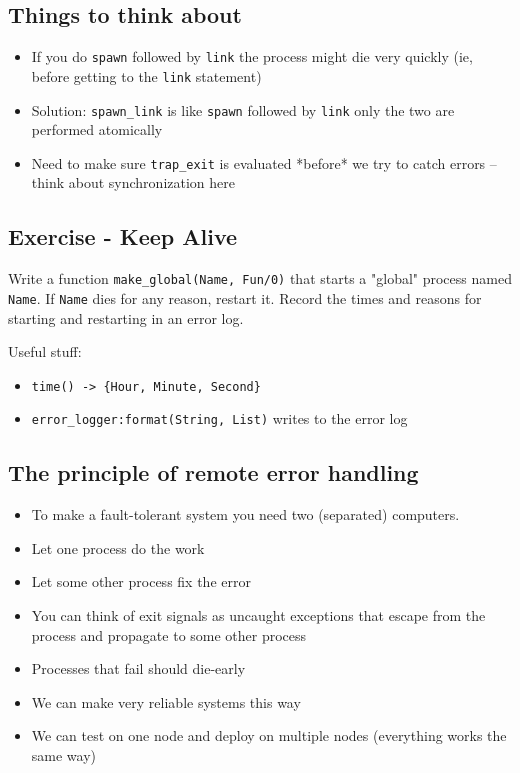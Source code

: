 \documentclass[12pt]{article}
\begin{document}
\subsection{Things to think about}

\begin{itemize}
\item If you do \verb+spawn+ followed by \verb+link+ the process might
  die very quickly (ie, before getting to the \verb+link+ statement)
\item Solution: \verb+spawn_link+ is like \verb+spawn+ followed by \verb+link+ only the two are performed atomically
\item Need to make sure \verb+trap_exit+ is evaluated *before* we try
  to catch errors -- think about synchronization here
\end{itemize}


\subsection{Exercise - Keep Alive}

Write a function \verb+make_global(Name, Fun/0)+ that starts a
"global" process named \verb+Name+.  If \verb+Name+ dies for any
reason, restart it. Record the times and reasons for starting and
restarting in an error log.

Useful stuff:

\begin{itemize}
\item \verb+time() -> {Hour, Minute, Second}+
\item \verb+error_logger:format(String, List)+ writes to the error log
\end{itemize}

\subsection{The principle of remote error handling}
\begin{itemize}
\item To make a fault-tolerant system you need two (separated) computers.
\item Let one process do the work
\item Let some other process fix the error
\item You can think of exit signals as uncaught exceptions that escape from the
process and propagate to some other process
\item Processes that fail should die-early
\item We can make very reliable systems this way
\item We can test  on one node and deploy on multiple nodes
(everything works the same way)
\end{itemize}
\end{document}
